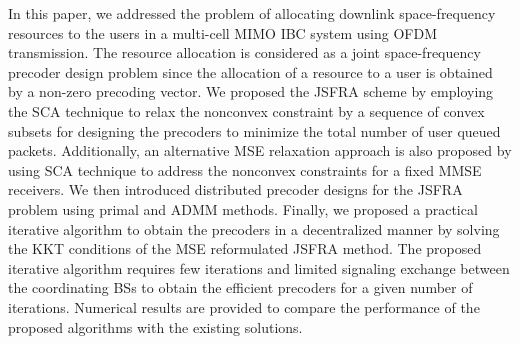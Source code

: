 In this paper, we addressed the problem of allocating downlink space-frequency resources to the users in a multi-cell \ac{MIMO} \ac{IBC} system using \ac{OFDM} transmission. The resource allocation is considered as a joint space-frequency precoder design problem since the allocation of a resource to a user is obtained by a non-zero precoding vector. We proposed the \ac{JSFRA} scheme by employing the \ac{SCA} technique to relax the nonconvex constraint by a sequence of convex subsets for designing the precoders to minimize the total number of user queued packets. Additionally, an alternative \ac{MSE} relaxation approach is also proposed by using \ac{SCA} technique to address the nonconvex constraints for a fixed \ac{MMSE} receivers. We then introduced distributed precoder designs for the \ac{JSFRA} problem using primal and \ac{ADMM} methods. Finally, we proposed a practical iterative algorithm to obtain the precoders in a decentralized manner by solving the \ac{KKT} conditions of the \ac{MSE} reformulated \ac{JSFRA} method. The proposed iterative algorithm requires few iterations and limited signaling exchange between the coordinating \acp{BS} to obtain the efficient precoders for a given number of iterations. Numerical results are provided to compare the performance of the proposed algorithms with the existing solutions.